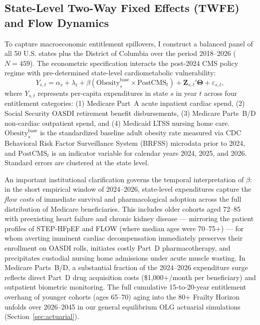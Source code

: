 \documentclass[11pt,a4paper]{article}
\begin{document}
\subsection{State-Level Two-Way Fixed Effects (TWFE) and Flow Dynamics}
To capture macroeconomic entitlement spillovers, I construct a balanced panel of all 50 U.S. states plus the District of Columbia over the period 2018--2026 ($N = 459$). The econometric specification interacts the post-2024 CMS policy regime with pre-determined state-level cardiometabolic vulnerability:
\begin{equation}
    Y_{s, t} = \alpha_s + \lambda_t + \beta \left( \text{Obesity}_s^{\text{base}} \times \text{PostCMS}_t \right) + \mathbf{Z}_{s, t}' \boldsymbol{\Theta} + \varepsilon_{s, t},
    \label{eq:twfe}
\end{equation}
where $Y_{s, t}$ represents per-capita expenditures in state $s$ in year $t$ across four entitlement categories: (1) Medicare Part~A acute inpatient cardiac spend, (2) Social Security OASDI retirement benefit disbursements, (3) Medicare Parts~B/D non-cardiac outpatient spend, and (4) Medicaid LTSS nursing home care. $\text{Obesity}_s^{\text{base}}$ is the standardized baseline adult obesity rate measured via CDC Behavioral Risk Factor Surveillance System (BRFSS) microdata prior to 2024, and $\text{PostCMS}_t$ is an indicator variable for calendar years 2024, 2025, and 2026. Standard errors are clustered at the state level.

An important institutional clarification governs the temporal interpretation of $\beta$: in the short empirical window of 2024--2026, state-level expenditures capture the \textit{flow costs} of immediate survival and pharmacological adoption across the full distribution of Medicare beneficiaries. This includes older cohorts aged 72--85 with preexisting heart failure and chronic kidney disease --- mirroring the patient profiles of STEP-HFpEF and FLOW (where median ages were 70--75+) --- for whom averting imminent cardiac decompensation immediately preserves their enrollment on OASDI rolls, initiates costly Part~D pharmacotherapy, and precipitates custodial nursing home admissions under acute muscle wasting. In Medicare Parts~B/D, a substantial fraction of the 2024--2026 expenditure surge reflects direct Part~D drug acquisition costs (\$1,000+/month per beneficiary) and outpatient biometric monitoring. The full cumulative 15-to-20-year entitlement overhang of younger cohorts (ages 65--70) aging into the 80+ Frailty Horizon unfolds over 2026--2045 in our general equilibrium OLG actuarial simulations (Section~\ref{sec:actuarial}).
\end{document}
